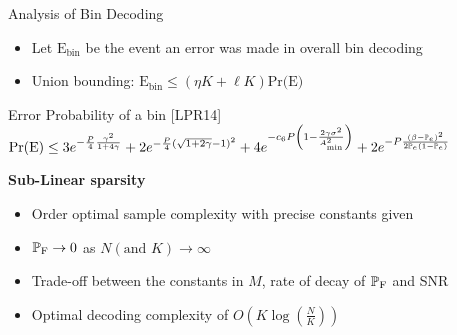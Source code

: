 \documentclass[10pt]{beamer}
\begin{document}
\begin{frame}{Analysis of Bin Decoding}
\begin{itemize}
\item Let $\text{E}_{\text{bin}}$ be the event an error was made in overall bin decoding
\item Union bounding: $\text{E}_{\text{bin}}\leq (\eta K+\ell K)\text{Pr(E)}$
\end{itemize}
\begin{block}{Error Probability of a bin [LPR14]}
$\text{Pr(E)}\leq 3e^{-\frac{P}{4}\frac{\gamma^2}{1+4 \gamma}}+2e^{-\frac{P}{4}(\sqrt{1+2\gamma}-1)^2}+4e^{-c_6 P\left(1-\frac{2\gamma\sigma^2}{A^{2}_{\text{min}}}\right)}+2e^{-P\frac{\left(\beta-\mathbb{P}_{e}\right)^2}{2\mathbb{P}_{e}(1-\mathbb{P}_{e})}}$
\end{block}
\vspace{2ex}
\begin{description}
    \item[\textbf{Sub-Linear sparsity}]
\end{description}
\begin{itemize}
\item Order optimal sample complexity with precise constants given
\item $\mathbb{P}_{\text{F}}\rightarrow 0$ as $N (\text{and } K)\rightarrow \infty$
\item Trade-off between the constants in $M$, rate of decay of  $\mathbb{P}_{\text{F}}$ and SNR
\item Optimal decoding complexity of $O\left(K\log\left(\frac{N}{K}\right)\right)$
\end{itemize}
\end{frame}
\end{document}

